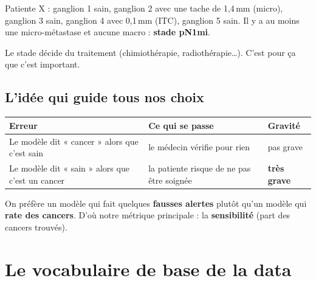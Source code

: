 \documentclass[11pt,a4paper]{article}
\begin{document}
\begin{analogie}
Patiente X : ganglion 1 sain, ganglion 2 avec une tache de 1,4\,mm (micro), ganglion 3 sain, ganglion 4 avec 0,1\,mm (ITC),
ganglion 5 sain. Il y a au moins une micro-métastase et aucune macro : \textbf{stade pN1mi}.
\end{analogie}

Le stade décide du traitement (chimiothérapie, radiothérapie\dots). C'est pour ça que c'est important.

\subsection{L'idée qui guide tous nos choix}
\begin{table}[H]
\centering
\begin{tabularx}{\textwidth}{XXl}
\toprule
\textbf{Erreur} & \textbf{Ce qui se passe} & \textbf{Gravité} \\
\midrule
Le modèle dit « cancer » alors que c'est sain & le médecin vérifie pour rien & pas grave \\
Le modèle dit « sain » alors que c'est un cancer & la patiente risque de ne pas être soignée & \textbf{très grave} \\
\bottomrule
\end{tabularx}
\end{table}

\begin{retenir}
On préfère un modèle qui fait quelques \textbf{fausses alertes} plutôt qu'un modèle qui \textbf{rate des cancers}. D'où notre
métrique principale : la \textbf{sensibilité} (part des cancers trouvés).
\end{retenir}

\section{Le vocabulaire de base de la data}\label{sec:vocab}
\end{document}
